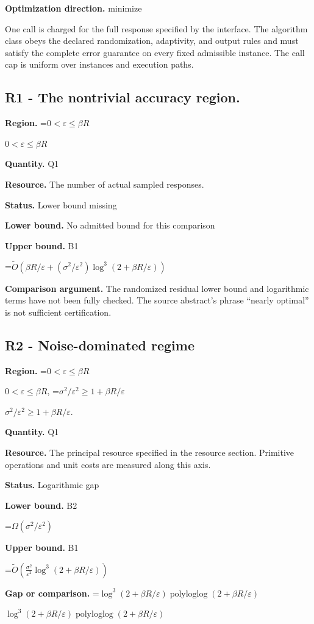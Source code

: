 \documentclass[10pt,a4paper]{article}
\newcommand{\AtlasMath}[1]{\par\begingroup\centering\setbox0=\hbox{$\displaystyle #1$}\ifdim\wd0>1.4\linewidth\typeout{ATLAS WIDE FORMULA: \the\wd0}\fi\ifdim\wd0>\linewidth\resizebox{\linewidth}{!}{\box0}\else\box0\fi\par\endgroup}
\newcommand{\AtlasInlineMath}[1]{\begingroup\setbox0=\hbox{$#1$}\ifdim\wd0>.4\linewidth\endgroup\AtlasMath{#1}\else\endgroup$#1$\fi}
\begin{document}
\textbf{Optimization direction.} minimize

One call is charged for the full response specified by the interface. The algorithm class obeys the declared randomization, adaptivity, and output rules and must satisfy the complete error guarantee on every fixed admissible instance. The call cap is uniform over instances and execution paths.

\subsection{R1 - The nontrivial accuracy region.}
\textbf{Region.} \AtlasInlineMath{0<\varepsilon\le\beta R}

\textbf{Quantity.} Q1

\textbf{Resource.} The number of actual sampled responses.

\textbf{Status.} Lower bound missing

\textbf{Lower bound.} No admitted bound for this comparison

\textbf{Upper bound.} B1

\AtlasMath{\widetilde{O}(\beta R/\varepsilon+(\sigma^2/\varepsilon^2)\log^3(2+\beta R/\varepsilon))}
\textbf{Comparison argument.} The randomized residual lower bound and logarithmic terms have not been fully checked. The source abstract's phrase “nearly optimal” is not sufficient certification.

\subsection{R2 - Noise-dominated regime}
\textbf{Region.} \AtlasInlineMath{0<\varepsilon\le\beta R}, \AtlasInlineMath{\sigma^2/\varepsilon^2\ge1+\beta R/\varepsilon}.

\textbf{Quantity.} Q1

\textbf{Resource.} The principal resource specified in the resource section. Primitive operations and unit costs are measured along this axis.

\textbf{Status.} Logarithmic gap

\textbf{Lower bound.} B2

\AtlasMath{\Omega(\sigma^2/\varepsilon^2)}
\textbf{Upper bound.} B1

\AtlasMath{\widetilde{O}\!\left(\frac{\sigma^2}{\varepsilon^2}\log^3(2+\beta R/\varepsilon)\right)}
\textbf{Gap or comparison.} \AtlasInlineMath{\log^3(2+\beta R/\varepsilon)\operatorname{polyloglog}(2+\beta R/\varepsilon)}
\end{document}

